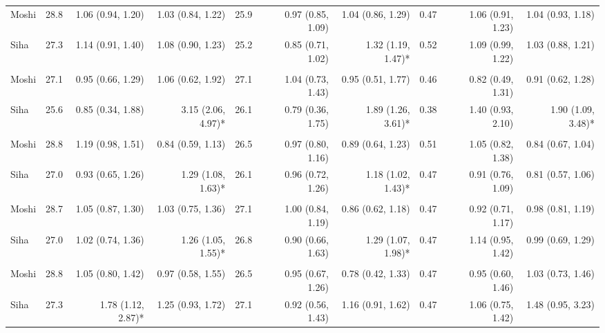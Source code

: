 \begin{table}[t]
\begin{tabular*}{\linewidth}{@{\extracolsep{\fill}}l|rrrrrrrrr}
\midrule\addlinespace[2.5pt]
\multicolumn{10}{l}{Intestinal Worms} \\[2.5pt] 
\midrule\addlinespace[2.5pt]
Moshi & 28.8 & 1.06 (0.94, 1.20)  & 1.03 (0.84, 1.22)  & 25.9 & 0.97 (0.85, 1.09)  & 1.04 (0.86, 1.29)  & 0.47 & 1.06 (0.91, 1.23)  & 1.04 (0.93, 1.18)  \\ 
Siha & 27.3 & 1.14 (0.91, 1.40)  & 1.08 (0.90, 1.23)  & 25.2 & 0.85 (0.71, 1.02)  & 1.32 (1.19, 1.47)* & 0.52 & 1.09 (0.99, 1.22)  & 1.03 (0.88, 1.21)  \\ 
\midrule\addlinespace[2.5pt]
\multicolumn{10}{l}{Neoplasms/Cancer} \\[2.5pt] 
\midrule\addlinespace[2.5pt]
Moshi & 27.1 & 0.95 (0.66, 1.29)  & 1.06 (0.62, 1.92)  & 27.1 & 1.04 (0.73, 1.43)  & 0.95 (0.51, 1.77)  & 0.46 & 0.82 (0.49, 1.31)  & 0.91 (0.62, 1.28)  \\ 
Siha & 25.6 & 0.85 (0.34, 1.88)  & 3.15 (2.06, 4.97)* & 26.1 & 0.79 (0.36, 1.75)  & 1.89 (1.26, 3.61)* & 0.38 & 1.40 (0.93, 2.10)  & 1.90 (1.09, 3.48)* \\ 
\midrule\addlinespace[2.5pt]
\multicolumn{10}{l}{Other Cardiovascular Diseases} \\[2.5pt] 
\midrule\addlinespace[2.5pt]
Moshi & 28.8 & 1.19 (0.98, 1.51)  & 0.84 (0.59, 1.13)  & 26.5 & 0.97 (0.80, 1.16)  & 0.89 (0.64, 1.23)  & 0.51 & 1.05 (0.82, 1.38)  & 0.84 (0.67, 1.04)  \\ 
Siha & 27.0 & 0.93 (0.65, 1.26)  & 1.29 (1.08, 1.63)* & 26.1 & 0.96 (0.72, 1.26)  & 1.18 (1.02, 1.43)* & 0.47 & 0.91 (0.76, 1.09)  & 0.81 (0.57, 1.06)  \\ 
\midrule\addlinespace[2.5pt]
\multicolumn{10}{l}{Mild/Moderate Anemia} \\[2.5pt] 
\midrule\addlinespace[2.5pt]
Moshi & 28.7 & 1.05 (0.87, 1.30)  & 1.03 (0.75, 1.36)  & 27.1 & 1.00 (0.84, 1.19)  & 0.86 (0.62, 1.18)  & 0.47 & 0.92 (0.71, 1.17)  & 0.98 (0.81, 1.19)  \\ 
Siha & 27.0 & 1.02 (0.74, 1.36)  & 1.26 (1.05, 1.55)* & 26.8 & 0.90 (0.66, 1.63)  & 1.29 (1.07, 1.98)* & 0.47 & 1.14 (0.95, 1.42)  & 0.99 (0.69, 1.29)  \\ 
\midrule\addlinespace[2.5pt]
\multicolumn{10}{l}{Caries} \\[2.5pt] 
\midrule\addlinespace[2.5pt]
Moshi & 28.8 & 1.05 (0.80, 1.42)  & 0.97 (0.58, 1.55)  & 26.5 & 0.95 (0.67, 1.26)  & 0.78 (0.42, 1.33)  & 0.47 & 0.95 (0.60, 1.46)  & 1.03 (0.73, 1.46)  \\ 
Siha & 27.3 & 1.78 (1.12, 2.87)* & 1.25 (0.93, 1.72)  & 27.1 & 0.92 (0.56, 1.43)  & 1.16 (0.91, 1.62)  & 0.47 & 1.06 (0.75, 1.42)  & 1.48 (0.95, 3.23)  \\ 

\end{tabular*}
\end{table}
